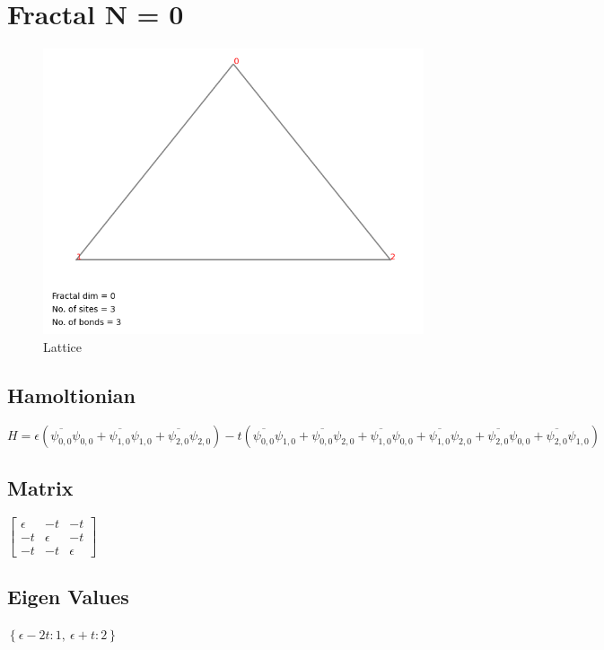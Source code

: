 \documentclass[11pt]{article}
\begin{document}
    \section{Fractal N = 0}
    \begin{figure}[h!]
      \centering
      \includegraphics[scale=0.7]{output//N=0//N=0_lattice.png}
      \caption{Lattice}
    \end{figure}
    
    \subsection{Hamoltionian}
    $H=\epsilon \left(\overline{\psi_{0, 0}} \psi_{0, 0} + \overline{\psi_{1, 0}} \psi_{1, 0} + \overline{\psi_{2, 0}} \psi_{2, 0}\right) - t \left(\overline{\psi_{0, 0}} \psi_{1, 0} + \overline{\psi_{0, 0}} \psi_{2, 0} + \overline{\psi_{1, 0}} \psi_{0, 0} + \overline{\psi_{1, 0}} \psi_{2, 0} + \overline{\psi_{2, 0}} \psi_{0, 0} + \overline{\psi_{2, 0}} \psi_{1, 0}\right)$

    \subsection{Matrix}
    $\left[\begin{matrix}\epsilon & - t & - t\\- t & \epsilon & - t\\- t & - t & \epsilon\end{matrix}\right]$

    \subsection{Eigen Values}
    $\left\{ \epsilon - 2 t : 1, \  \epsilon + t : 2\right\}$
\end{document}
